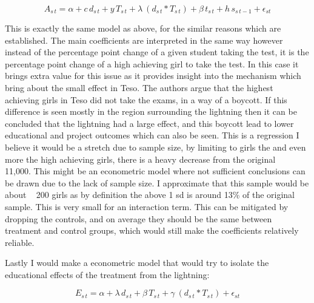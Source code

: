 \documentclass{article}
\begin{document}
\[ A_{s\,t} = \alpha + c\,d_{s\,t} + y\,T_{s\,t} +  \lambda\ (d_{s\,t}* T_{s\,t})+\beta \,t_{s\,t}+h\, s_{s\,t-1}+ \epsilon_{s t}\]

This is exactly the same model as above, for the similar reasons which are established. The main coefficients are interpreted in the same way however instead of the percentage point change of a given student taking the test, it is the percentage point change of a high achieving girl to take the test. In this case it brings extra value for this issue as it provides insight into the mechanism which bring about the small effect in Teso. The authors argue that the highest achieving girls in Teso did not take the exams, in a way of a boycott. If this difference is seen mostly in the region surrounding the lightning then it can be concluded that the lightning had a large effect, and this boycott lead to lower educational and project outcomes which can also be seen. This is a regression I believe it would be a stretch due to sample size, by limiting to girls the and even more the high achieving girls, there is a heavy decrease from the original ~ 11,000. This might be an econometric model where not sufficient conclusions can be drawn due to the lack of sample size. I approximate that this sample would be about ~ 200 girls as by definition the above 1 sd is around 13\% of the original sample. This is very small for an interaction term. This can be mitigated by dropping the controls, and on average they should be the same between treatment and control groups, which would still make the coefficients relatively reliable. 

Lastly I would make a econometric model that would try to isolate the educational effects of the treatment from the lightning:

\[ E_{s\,t} = \alpha + \lambda\,d_{s\,t} + \beta\,T_{s\,t} +  \gamma\ (d_{s\,t}* T_{s\,t})+ \epsilon_{s t}\]
\end{document}
